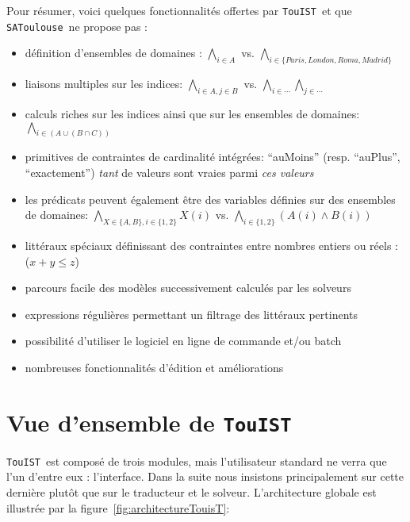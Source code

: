 \documentclass{iaf}
\newcommand{\AND}[0]{\wedge}
\newcommand{\satoulouse}{{\sc Satoulouse}\xspace}
\renewcommand{\satoulouse}{{\sc \texttt {SAToulouse}}}
\newcommand{\nameTool}{{\sc \texttt {TouIST}}}
\begin{document}
Pour r\'{e}sumer, voici quelques fonctionnalit\'{e}s offertes par \nameTool\ et que \satoulouse\ ne propose pas :
\begin{itemize}
\item d\'{e}finition d'ensembles de domaines : $\bigwedge_{i\in A}$ vs. $\bigwedge_{i\in\{Paris,London,Roma,Madrid\}}$
\item liaisons multiples sur les indices: $\bigwedge_{i\in A,j\in B}$ vs. $\bigwedge_{i\in \cdots} \bigwedge_{j\in \cdots}$
\item calculs riches sur les indices ainsi que sur les ensembles de domaines: $\bigwedge_{i\in (A\cup (B \cap C))}$
\item primitives de contraintes de cardinalit\'{e} int\'{e}gr\'{e}es: ``auMoins'' (resp. ``auPlus'', ``exactement'') \emph{tant} de valeurs sont vraies parmi \emph{ces valeurs}
\item les pr\'{e}dicats peuvent \'{e}galement \^{e}tre des variables d\'{e}finies sur des ensembles de domaines: $\bigwedge_{X\in \{A,B\},i\in \{1,2\}} X(i)$ vs. $\bigwedge_{i\in \{1,2\}} (A(i)\AND B(i))$
\item litt\'{e}raux sp\'{e}ciaux d\'{e}finissant des contraintes entre nombres entiers ou r\'{e}els : ($x+y\leq z$)
\item parcours facile des mod\`{e}les successivement calcul\'{e}s par les solveurs
\item expressions r\'{e}guli\`{e}res permettant un filtrage des litt\'{e}raux pertinents
\item possibilit\'{e} d'utiliser le logiciel en ligne de commande et/ou batch
\item nombreuses fonctionnalit\'{e}s d'\'{e}dition et am\'{e}liorations
\end{itemize}







\section{Vue d'ensemble de \nameTool}\label{sec:sat_interface}


\nameTool\ est compos\'e de trois modules, mais l'utilisateur standard ne verra que l'un d'entre eux : l'interface. Dans la suite nous insistons principalement sur cette derni\`ere plut\^ot que sur le traducteur et le solveur. L'architecture globale est illustr\'{e}e par la figure~\ref{fig:architectureTouisT}: 
\end{document}
